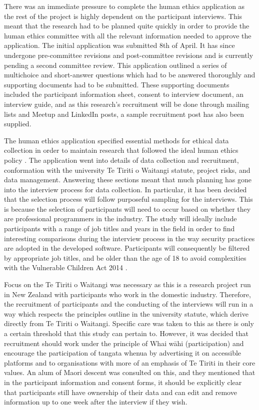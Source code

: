 \par There was an immediate pressure to complete the human ethics application as the rest of the project is highly dependent on the participant interviews. This meant that the research had to be planned quite quickly in order to provide the human ethics committee with all the relevant information needed to approve the application. The initial application was submitted 8th of April. It has since undergone pre-committee revisions and post-committee revisions and is currently pending a second committee review. This application outlined a series of multichoice and short-answer questions which had to be answered thoroughly and supporting documents had to be submitted. These supporting documents included the participant information sheet, consent to interview document, an interview guide, and as this research’s recruitment will be done through mailing lists and Meetup and LinkedIn posts, a sample recruitment post has also been supplied. 
\newline
\par The human ethics application specified essential methods for ethical data collection in order to maintain research that followed the ideal human ethics policy \cite{hepol}. The application went into details of data collection and recruitment, conformation with the university Te Tiriti o Waitangi statute, project risks, and data management. Answering these sections meant that much planning has gone into the interview process for data collection. In particular, it has been decided that the selection process will follow purposeful sampling for the interviews. This is because the selection of participants will need to occur based on whether they are professional programmers in the industry. The study will ideally include participants with a range of job titles and years in the field in order to find interesting comparisons during the interview process in the way security practices are adopted in the developed software. Participants will consequently be filtered by appropriate job titles, and be older than the age of 18 to avoid complexities with the Vulnerable Children Act 2014 \cite{childact}.
\newline
\par Focus on the Te Tiriti o Waitangi was necessary as this is a research project run in New Zealand with participants who work in the domestic industry. Therefore, the recruitment of participants and the conducting of the interviews will run in a way which respects the principles outline in the university statute, which derive directly from Te Tiriti o Waitangi. Specific care was taken to this as there is only a certain threshold that this study can pertain to. However, it was decided that recruitment should work under the principle of Whai wāhi (participation) and encourage the participation of tangata whenua by advertising it on accessible platforms and to organisations with more of an emphasis of Te Tiriti in their core values. An alum of Maori descent was consulted on this, and they mentioned that in the participant information and consent forms, it should be explicitly clear that participants still have ownership of their data and can edit and remove information up to one week after the interview if they wish.
